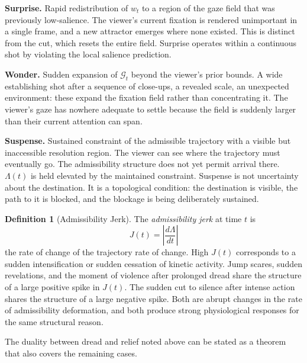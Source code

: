 \documentclass[12pt, a4paper]{article}
\theoremstyle{plain}
\theoremstyle{definition}
\newtheorem{definition}[theorem]{Definition}
\theoremstyle{remark}
\newcommand{\G}{\mathcal{G}}
\newcommand{\salience}{w}
\newcommand{\jerk}{J}
\begin{document}
\medskip
\noindent\textbf{Surprise.} Rapid redistribution of
$\salience_t$ to a region of the gaze field that was
previously low-salience. The viewer's current fixation is
rendered unimportant in a single frame, and a new attractor
emerges where none existed. This is distinct from the cut,
which resets the entire field. Surprise operates within
a continuous shot by violating the local salience
prediction.

\medskip
\noindent\textbf{Wonder.} Sudden expansion of $\G_t$
beyond the viewer's prior bounds. A wide establishing shot
after a sequence of close-ups, a revealed scale, an
unexpected environment: these expand the fixation field
rather than concentrating it. The viewer's gaze has
nowhere adequate to settle because the field is suddenly
larger than their current attention can span.

\medskip
\noindent\textbf{Suspense.} Sustained constraint of the
admissible trajectory with a visible but inaccessible
resolution region. The viewer can see where the trajectory
must eventually go. The admissibility structure does not
yet permit arrival there. $\Lambda(t)$ is held elevated
by the maintained constraint. Suspense is not uncertainty
about the destination. It is a topological condition: the
destination is visible, the path to it is blocked, and
the blockage is being deliberately sustained.

\begin{definition}[Admissibility Jerk]
  The \emph{admissibility jerk} at time $t$ is
  \begin{equation}
    \jerk(t) = \left| \frac{d\Lambda}{dt} \right|
  \end{equation}
  the rate of change of the trajectory rate of change.
  High $\jerk(t)$ corresponds to a sudden intensification
  or sudden cessation of kinetic activity. Jump scares,
  sudden revelations, and the moment of violence after
  prolonged dread share the structure of a large positive
  spike in $\jerk(t)$. The sudden cut to silence after
  intense action shares the structure of a large negative
  spike. Both are abrupt changes in the rate of admissibility
  deformation, and both produce strong physiological
  responses for the same structural reason.
\end{definition}

The duality between dread and relief noted above can be
stated as a theorem that also covers the remaining cases.
\end{document}
